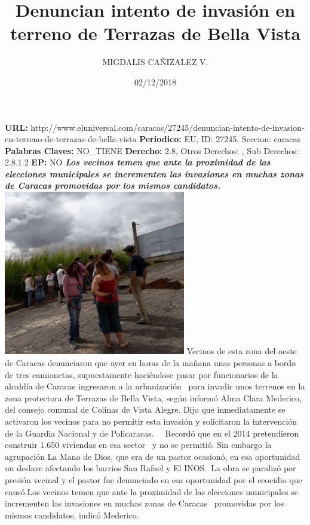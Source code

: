 \documentclass{article}%
\title{\textbf{Denuncian intento de invasión en terreno de Terrazas de Bella Vista}}%
\author{MIGDALIS CAÑIZALEZ V.}%
\date{02/12/2018}%
\begin{document}
%
\normalsize%
\maketitle%
\textbf{URL: }%
http://www.eluniversal.com/caracas/27245/denuncian{-}intento{-}de{-}invasion{-}en{-}terreno{-}de{-}terrazas{-}de{-}bella{-}vista\newline%
%
\textbf{Periodico: }%
EU, %
ID: %
27245, %
Seccion: %
caracas\newline%
%
\textbf{Palabras Claves: }%
NO\_TIENE\newline%
%
\textbf{Derecho: }%
2.8, %
Otros Derechos: %
, %
Sub Derechos: %
2.8.1.2\newline%
%
\textbf{EP: }%
NO\newline%
\newline%
%
\textbf{\textit{Los vecinos temen que ante la proximidad de las elecciones municipales se incrementen las invasiones en muchas zonas de Caracas  promovidas por los mismos candidatos.}}%
\newline%
\newline%
%
\includegraphics[width=300px]{260.jpg}%
\newline%
%
Vecinos de esta zona del oeste de Caracas denunciaron que ayer en horas de la mañana unas personas a bordo de tres camionetas, supuestamente haciéndose pasar por funcionarios de la alcaldía de Caracas ingresaron a la urbanización~ para invadir unos terrenos en la zona protectora de Terrazas de Bella Vista,  según informó Alma Clara Mederico, del consejo comunal de Colinas de Vista Alegre.%
\newline%
%
Dijo que inmediatamente se activaron los vecinos para no permitir esta invasión y solicitaron la intervención de la Guardia Nacional y de Policaracas.~ ~Recordó que  en el 2014 pretendieron construir 1.650 viviendas en esa sector~ y no se permitió. Sin embargo la agrupación La Mano de Dios, que era de un pastor ocasionó, en esa oportunidad~ un deslave afectando los barrios San Rafael y El INOS.~La obra se paralizó por presión vecinal y el pastor fue denunciado en esa oportunidad por el ecocidio que causó.Los vecinos temen que ante la proximidad de las elecciones municipales se incrementen las invasiones en muchas zonas de Caracas~ promovidas por los mismos candidatos, indicó Mederico.%
\newline%
%
\end{document}

